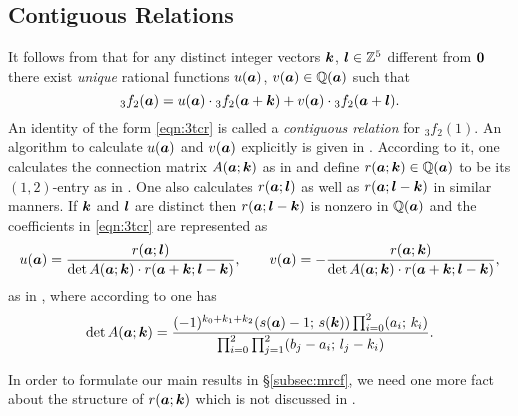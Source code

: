 \documentclass[a4paper,12pt]{article}
\theoremstyle{plain}
\def\Q{\mathbb{Q}}
\def\Z{\mathbb{Z}}
\def\ba{\mbox{\boldmath $a$}}
\def\bk{\mbox{\boldmath $k$}}
\def\bl{\mbox{\boldmath $l$}}
\def\0{\mbox{\boldmath $0$}}
\begin{document}
\subsection{Contiguous Relations} \label{subsec:cr}
It follows from \cite[Theorem 1.1]{EI} that for any distinct integer vectors 
$\bk$, $\bl \in \Z^5$ different from $\0$ there exist {\sl unique} rational functions 
$u(\ba)$, $v(\ba) \in \Q(\ba)$ such that 
\begin{equation} \label{eqn:3tcr}
{}_3f_2(\ba) = u(\ba) \cdot {}_3f_2(\ba + \bk) + v(\ba) \cdot 
{}_3f_2(\ba + \bl).      
\end{equation} 
An identity of the form \eqref{eqn:3tcr} is called a {\sl contiguous relation} for 
${}_3f_2(1)$.        
An algorithm to calculate $u(\ba)$ and $v(\ba)$ explicitly is given in 
\cite[Recipe 5.4]{EI}. 
According to it, one calculates the connection matrix $A(\ba; \bk)$ as in 
\cite[formula (30)]{EI} and define $r(\ba; \bk) \in \Q(\ba)$ to be its $(1, 2)$-entry 
as in \cite[formula (33)]{EI}. 
One also calculates $r(\ba; \bl)$ as well as $r(\ba; \bl-\bk)$ in similar manners. 
If $\bk$ and $\bl$ are distinct then $r(\ba; \bl-\bk)$ is nonzero in 
$\Q(\ba)$ and the coefficients in \eqref{eqn:3tcr} are represented as 
\begin{equation} \label{eqn:uv}
u(\ba) = \dfrac{r(\ba; \bl)}{ \det A(\ba;\bk) \cdot r(\ba+\bk; \bl-\bk)}, 
\qquad 
v(\ba) = - \dfrac{r(\ba; \bk)}{ \det A(\ba; \bk) \cdot r(\ba+\bk; \bl-\bk)},  
\end{equation}
as in \cite[Proposition 5.3]{EI}, where according to \cite[formula (32)]{EI} one has    
\begin{equation} \label{eqn:eps(a;k)} 
\det A(\ba; \bk) = \dfrac{(-1)^{k_0+k_1+k_2} 
(s(\ba)-1; \, s(\bk)) \prod_{i=0}^2 (a_i; \, k_i) }{ \prod_{i=0}^2 \prod_{j=1}^2 
(b_j-a_i; \, l_j-k_i) }. 
\end{equation}
\par
In order to formulate our main results in \S\ref{subsec:mrcf}, we need one more 
fact about the structure of $r(\ba; \bk)$ which is not discussed in \cite{EI}.    
\end{document}
